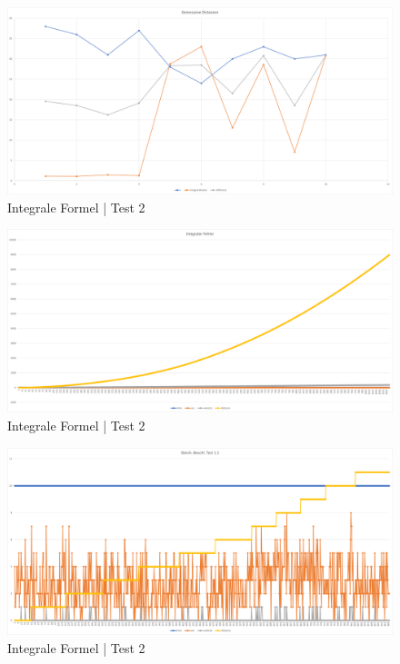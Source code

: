 \begin{figure} [h]
    \centering
    \includegraphics[width = 15cm]{Bilder/_DistanzVergleich}
    \caption{Integrale Formel | Test 2}
    \end{figure}


\begin{figure} [h]
    \centering
    \includegraphics[width = 15cm]{Bilder/_integralDistance001}
    \caption{Integrale Formel | Test 2}
    \end{figure}

    \begin{figure} [h]
        \centering
        \includegraphics[width = 15cm]{Bilder/_constDistance001}
        \caption{Integrale Formel | Test 2}
        \end{figure}
    
